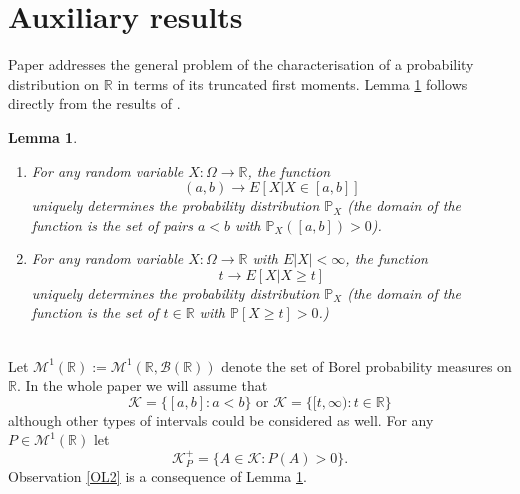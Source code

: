 \documentclass[sn-mathphys,Numbered,11pt]{sn-jnl}%
\theoremstyle{thmstyleone}%
\newtheorem{lemma}[theorem]{Lemma}
\newcommand{\mcl}{\mathcal}
\newcommand{\R}{\mathbb{R}}
\newcommand{\PP}{\mathbb{P}}
\newcommand{\M}{\mathcal{M}^1(\R)}
\newcommand{\KK}{\mathcal{K}}
\begin{document}
 
\section{Auxiliary results}\label{S3}

  Paper \cite{Navarro} addresses the general problem of the characterisation of a probability distribution on $\R$ in terms of its truncated first moments. Lemma \ref{L2}  follows directly from the results of \cite{Navarro}.
\begin{lemma}\label{L2}
\begin{enumerate}
\item For any random variable $X\colon\Omega\to\R$, the function
\begin{equation}\label{C1} (a,b)\to E[X|X\in [a,b] ]
\end{equation}
uniquely determines the probability distribution $\PP_X$ (the domain of the function is the set of pairs $a<b$ with $\PP_X([a,b])>0$). 
\item For any random variable $X\colon\Omega\to\R$ with $E|X|<\infty$, the function
\begin{equation}\label{C2} 
t\to E[X|X\geq t]
\end{equation}
uniquely determines the probability distribution $\PP_X$ (the domain of the function is the set of $t\in\R$ with $\PP[X\geq t]>0$.)
\end{enumerate}
\end{lemma}
\ \\ 
 Let $\M:=\mcl{M}^1(\R,\mcl{B}(\R))$ denote the set of Borel probability measures on $\R$. In the whole paper we will assume that 
$$\KK=\{[a,b]\colon a<b\} \mbox{ or }\KK=\{[t,\infty)\colon t\in\R\}$$
although other types of intervals could be considered as well. For any $P\in\M$ let 
$$\KK^+_P=\{A\in\KK\colon P(A)>0\}.$$ 
Observation \ref{OL2} is a consequence of Lemma \ref{L2}. 
\end{document}

